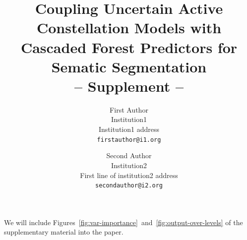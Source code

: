 \documentclass[10pt,twocolumn,letterpaper]{article}
\begin{document}
\title{Coupling Uncertain Active Constellation Models with \\
Cascaded Forest Predictors for Sematic Segmentation \\ -- Supplement --}

\author{First Author\\
Institution1\\
Institution1 address\\
{\tt\small firstauthor@i1.org}
\and
Second Author\\
Institution2\\
First line of institution2 address\\
{\tt\small secondauthor@i2.org}
}

\maketitle

We will include Figures~\ref{fig:var-importance}~and~\ref{fig:output-over-levels} of the supplementary material into the paper. 

\end{document}
